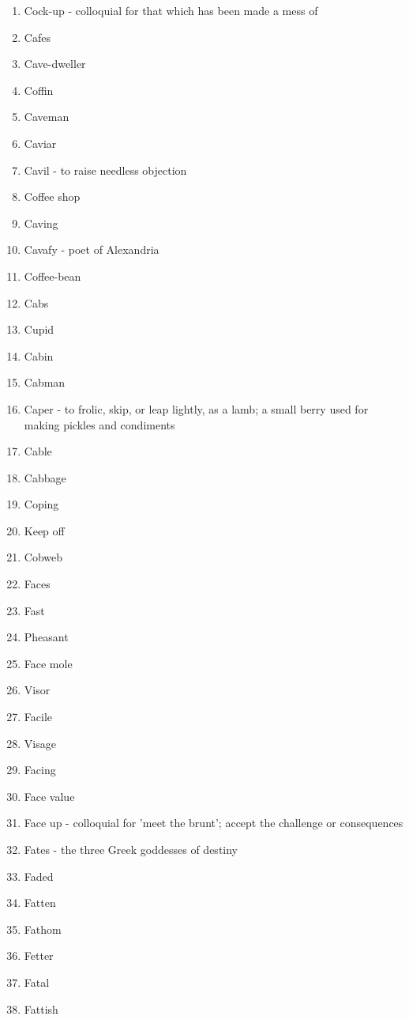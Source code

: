 \begin{enumerate}
        \item Cock-up - colloquial for that which has been made a mess of
        \item Cafes
        \item Cave-dweller
        \item Coffin
        \item Caveman
        \item Caviar
        \item Cavil - to raise needless objection
        \item Coffee shop
        \item Caving
        \item Cavafy - poet of Alexandria
        \item Coffee-bean
        \item Cabs
        \item Cupid
        \item Cabin
        \item Cabman
        \item Caper - to frolic, skip, or leap lightly, as a lamb; a small berry used for making pickles and condiments
        \item Cable
        \item Cabbage
        \item Coping
        \item Keep off
        \item Cobweb
        \item Faces
        \item Fast
        \item Pheasant
        \item Face mole
        \item Visor
        \item Facile
        \item Visage
        \item Facing
        \item Face value
        \item Face up - colloquial for 'meet the brunt'; accept the challenge or consequences
        \item Fates - the three Greek goddesses of destiny
        \item Faded
        \item Fatten
        \item Fathom
        \item Fetter
        \item Fatal
        \item Fattish

\end{enumerate}
